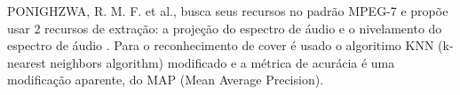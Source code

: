 PONIGHZWA, R. M. F. et al., busca seus recursos no padrão MPEG-7 e propõe usar 2 recursos de extração: a projeção do espectro de áudio e o nivelamento do espectro de áudio \cite{8257086}. Para o reconhecimento de cover é usado o algoritimo KNN (k-nearest neighbors algorithm) modificado e a métrica de acurácia é uma modificação aparente, do MAP (Mean Average Precision).


